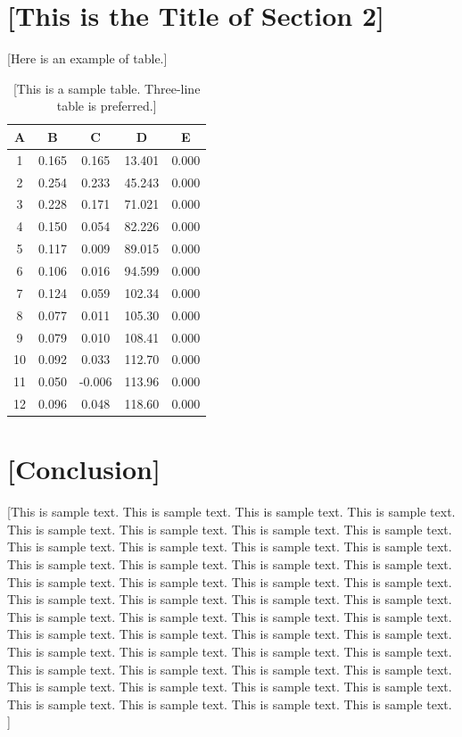 \documentclass[a4paper,11pt,onecolumn,twoside]{article}
\begin{document}
\section{[This is the Title of Section 2]}
[Here is an example of table.]
\begin{table}[H]
  \centering
  \begin{tabular}{ccccc}
    \midrule[1.5pt]
    A & B & C & D & E \\
    \hline
    1 & 0.165 & 0.165 & 13.401 & 0.000 \\
    2 & 0.254 & 0.233 & 45.243 & 0.000 \\
    3 & 0.228 & 0.171 & 71.021 & 0.000 \\
    4 & 0.150 & 0.054 & 82.226 & 0.000 \\
    5 & 0.117 & 0.009 & 89.015 & 0.000 \\
    6 & 0.106 & 0.016 & 94.599 & 0.000 \\
    7 & 0.124 & 0.059 & 102.34 & 0.000 \\
    8 & 0.077 & 0.011 & 105.30 & 0.000 \\
    9 & 0.079 & 0.010 & 108.41 & 0.000 \\
    10 & 0.092 & 0.033 & 112.70 & 0.000 \\
    11 & 0.050 & -0.006 & 113.96 & 0.000 \\
    12 & 0.096 & 0.048 & 118.60 & 0.000 \\
    \midrule[1.5pt]
  \end{tabular}
  \caption{[This is a sample table. Three-line table is preferred.]}
\end{table}

\section{[Conclusion]}
[This is sample text. This is sample text. This is sample text. This is sample text. This is sample text. This is sample text. This is sample text. This is sample text. This is sample text. This is sample text. This is sample text. This is sample text. This is sample text. This is sample text. This is sample text. This is sample text. This is sample text. This is sample text. This is sample text. This is sample text. This is sample text. This is sample text. This is sample text. This is sample text. This is sample text. This is sample text. This is sample text. This is sample text. This is sample text. This is sample text. This is sample text. This is sample text. This is sample text. This is sample text. This is sample text. This is sample text. This is sample text. This is sample text. This is sample text. This is sample text. This is sample text. This is sample text. This is sample text. This is sample text. This is sample text. This is sample text. This is sample text. This is sample text. ]
\end{document}
